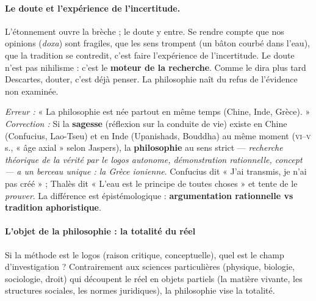 \documentclass[11pt]{article}
\newcommand{\cle}[1]{{\popxbold\color{popdark}#1}}
\begin{document}
\paragraph{Le doute et l'expérience de l'incertitude.}
L'étonnement ouvre la brèche ; le \cle{doute} y entre. Se rendre compte que nos opinions (\emph{doxa}) sont fragiles, que les sens trompent (un bâton courbé dans l'eau), que la tradition se contredit, c'est faire l'expérience de l'\cle{incertitude}. Le doute n'est pas nihilisme : c'est le \textbf{moteur de la recherche}. Comme le dira plus tard \cle{Descartes}, douter, c'est déjà penser. La philosophie naît du refus de l'évidence non examinée.

\begin{attention}
\emph{Erreur :} « La philosophie est née partout en même temps (Chine, Inde, Grèce). »
\emph{Correction :} Si la \textbf{sagesse} (réflexion sur la conduite de vie) existe en Chine (Confucius, Lao-Tseu) et en Inde (Upanishads, Bouddha) au même moment (\textsc{vi}--\textsc{v} s., « âge axial » selon Jaspers), la \textbf{philosophie} au sens strict — \emph{recherche théorique de la vérité par le logos autonome, démonstration rationnelle, concept — a un berceau unique : la Grèce ionienne}. Confucius dit « J'ai transmis, je n'ai pas créé » ; Thalès dit « L'eau est le principe de toutes choses » et tente de le \emph{prouver}. La différence est épistémologique : \textbf{argumentation rationnelle vs tradition aphoristique}.
\end{attention}

\paragraph{L'objet de la philosophie : la totalité du réel}

Si la méthode est le \cle{logos} (raison critique, conceptuelle), quel est le \cle{champ} d'investigation ? Contrairement aux sciences particulières (physique, biologie, sociologie, droit) qui découpent le réel en \cle{objets partiels} (la matière vivante, les structures sociales, les normes juridiques), la philosophie vise la \cle{totalité}.
\end{document}
